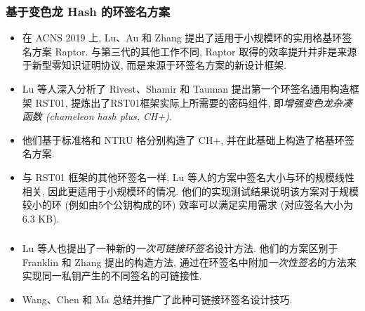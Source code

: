 \documentclass{beamer}
\begin{document}
\begin{frame}
    \frametitle{基于变色龙 Hash 的环签名方案}
    \begin{itemize}
        \item 在 ACNS 2019 上, Lu、Au 和 Zhang 提出了适用于小规模环的实用格基环签名方案 Raptor. 与第三代的其他工作不同, Raptor 取得的效率提升并非是来源于新型零知识证明协议, 而是来源于环签名方案的新设计框架. 
        \item Lu 等人深入分析了 Rivest、Shamir 和 Tauman 提出第一个环签名通用构造框架 RST01, 提炼出了RST01框架实际上所需要的密码组件, 即\emph{增强变色龙杂凑函数 (chameleon hash plus, CH+)}. 
        \item 他们基于标准格和 NTRU 格分别构造了 CH+, 并在此基础上构造了格基环签名方案. 
        \item 与 RST01 框架的其他环签名一样, Lu 等人的方案中签名大小与环的规模线性相关, 因此更适用于小规模环的情况. 他们的实现测试结果说明该方案对于规模较小的环 (例如由5个公钥构成的环) 效率可以满足实用需求 (对应签名大小为6.3 KB).
    \end{itemize}
    

\end{frame}

\begin{frame}
    \frametitle{}

    \begin{itemize}
        \item Lu 等人也提出了一种新的\emph{一次可链接环签名}设计方法. 他们的方案区别于 Franklin 和 Zhang 提出的构造方法, 通过在环签名中附加\emph{一次性签名}的方法来实现同一私钥产生的不同签名的可链接性. 
        \item Wang、Chen 和 Ma 总结并推广了此种可链接环签名设计技巧.
    \end{itemize}

\end{frame}
\end{document}
